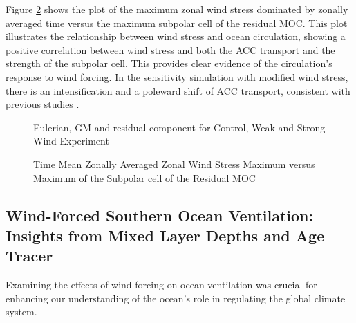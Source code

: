 \documentclass[12pt]{article}
\begin{document}
\noindent Figure \ref{fig:R2b} shows the plot of the maximum zonal wind stress dominated by zonally averaged time versus the maximum subpolar cell of the residual MOC. This plot illustrates the relationship between wind stress and ocean circulation, showing a positive correlation between wind stress and both the ACC transport and the strength of the subpolar cell. This provides clear evidence of the circulation's response to wind forcing. In the sensitivity simulation with modified wind stress, there is an intensification and a poleward shift of ACC transport, consistent with previous studies \citep{boning2008response}. 



\begin{figure}
    \begin{center}
    \caption{Eulerian, GM and residual component for Control, Weak and Strong Wind Experiment}
    \label{fig:R1}
    \end{center}
\end{figure}

\begin{figure}
    \begin{center}
    \caption{Time Mean Zonally Averaged Zonal Wind Stress Maximum versus Maximum of the Subpolar cell of the Residual MOC}
    \label{fig:R2b}
    \end{center}
\end{figure}


\subsection{Wind-Forced Southern Ocean Ventilation: Insights from Mixed Layer Depths and Age Tracer}
Examining the effects of wind forcing on ocean ventilation was crucial for enhancing our understanding of the ocean's role in regulating the global climate system. \\
\end{document}
